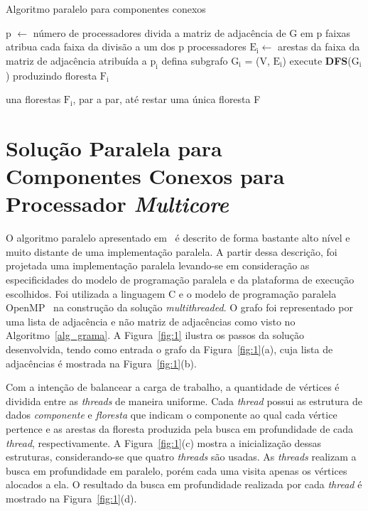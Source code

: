 \documentclass[12pt]{article}
\begin{document}
\begin{algorithm}[!htb]
    \DontPrintSemicolon
    \newcommand\mycommfont[1]{\small\ttfamily{#1}}
    \caption{Algoritmo paralelo para componentes conexos}
    \label{alg_grama}
    {
        p $\gets$ número de processadores\;
        divida a matriz de adjacência de G em p faixas\;
        atribua cada faixa da divisão a um dos p processadores\;
        {
            $\text{E}_\text{i} \gets$ arestas da faixa da matriz de adjacência atribuída a $\text{p}_\text{i}$\;
            defina subgrafo $\text{G}_\text{i}$ = (V, $\text{E}_\text{i}$)\;
            execute \textbf{DFS}($\text{G}_\text{i}$) produzindo floresta $\text{F}_\text{i}$\;
        }

        una florestas $\text{F}_\text{i}$, par a par, até restar uma única floresta F\;
    }
\end{algorithm}

\section{Solução Paralela para Componentes Conexos para Processador \emph{Multicore}}
\label{paralelo}

O algoritmo paralelo apresentado em~\cite{Grama:2003} é descrito de forma bastante alto nível e muito distante de uma implementação paralela. A partir dessa descrição, foi projetada uma implementação paralela levando-se em consideração as especificidades do modelo de programação paralela e da plataforma de execução escolhidos. Foi utilizada a linguagem C e o modelo de programação paralela OpenMP~\cite{OpenMP:2018} na construção da solução \emph{multithreaded}. O grafo foi representado por uma lista de adjacência e não matriz de adjacências como visto no Algoritmo~\ref{alg_grama}. A Figura~\ref{fig:1} ilustra os passos da solução desenvolvida, tendo como entrada o grafo da Figura~\ref{fig:1}(a), cuja lista de adjacências é mostrada na Figura~\ref{fig:1}(b). 

Com a intenção de balancear a carga de trabalho, a quantidade de vértices é dividida entre as \emph{threads} de maneira uniforme. Cada \emph{thread} possui as estrutura de dados \emph{componente} e \emph{floresta} que indicam o componente ao qual cada vértice pertence e as arestas da floresta produzida pela busca em profundidade de cada \emph{thread}, respectivamente. A Figura~\ref{fig:1}(c) mostra a inicialização dessas estruturas, considerando-se que quatro \emph{threads} são usadas. As \emph{threads} realizam a busca em profundidade em paralelo, porém cada uma visita apenas os vértices alocados a ela. O resultado da busca em profundidade realizada por cada \emph{thread} é mostrado na Figura~\ref{fig:1}(d).
\end{document}
